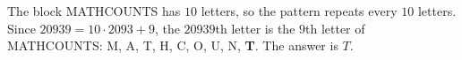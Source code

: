The block MATHCOUNTS has $10$ letters, so the pattern repeats every $10$ letters. Since $20939=10\cdot2093+9$, the $20939$th letter is the $9$th letter of MATHCOUNTS: M, A, T, H, C, O, U, N, \textbf{T}. The answer is $\boxed{T}$.
